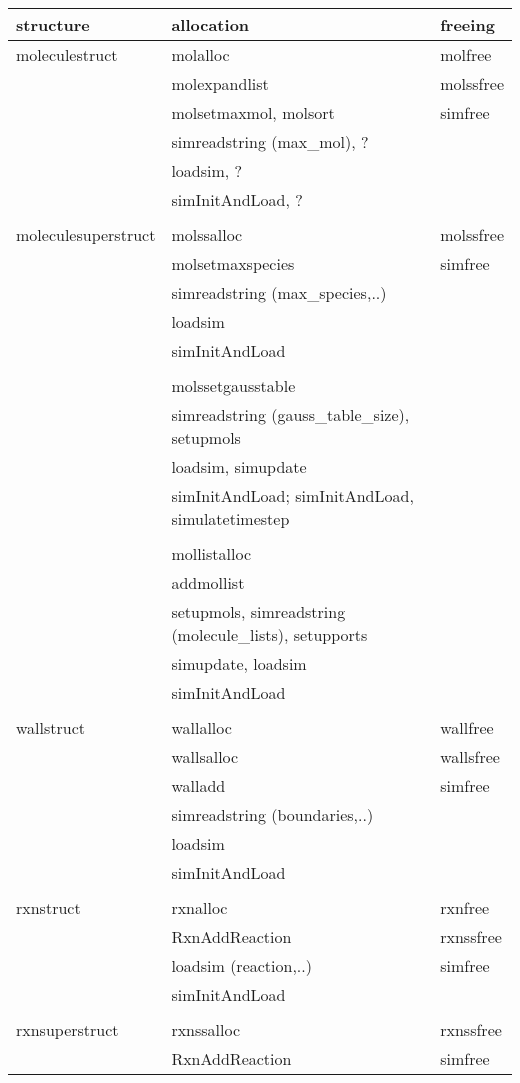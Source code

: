 \documentclass {scrbook}
\begin{document}
\begin{ttfamily}
\begin{longtable}[c]{lll}
structure&allocation&freeing\\
\hline
moleculestruct&molalloc&molfree\\
&molexpandlist&molssfree\\
&molsetmaxmol, molsort&simfree\\
&simreadstring (max\_mol), ?\\
&loadsim, ?\\
&simInitAndLoad, ?\\
\\
moleculesuperstruct&molssalloc&molssfree\\
&molsetmaxspecies&simfree\\
&simreadstring (max\_species,..)\\
&loadsim\\
&simInitAndLoad\\
\\
&molssetgausstable\\
&simreadstring (gauss\_table\_size), setupmols\\
&loadsim, simupdate\\
&simInitAndLoad; simInitAndLoad, simulatetimestep\\
\\
&mollistalloc\\
&addmollist\\
&setupmols, simreadstring (molecule\_lists), setupports\\
&simupdate, loadsim\\
&simInitAndLoad\\
\\
wallstruct&wallalloc&wallfree\\
&wallsalloc&wallsfree\\
&walladd&simfree\\
&simreadstring (boundaries,..)\\
&loadsim\\
&simInitAndLoad\\
\\
rxnstruct&rxnalloc&rxnfree\\
&RxnAddReaction&rxnssfree\\
&loadsim (reaction,..)&simfree\\
&simInitAndLoad\\
\\
rxnsuperstruct&rxnssalloc&rxnssfree\\
&RxnAddReaction&simfree\\

\end{longtable}
\end{ttfamily}
\end{document}
